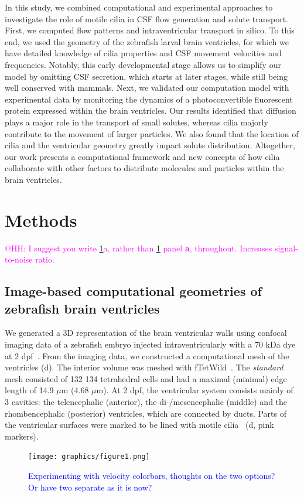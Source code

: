 \documentclass[fleqn]{wlscirep}
\newcommand{\lyng}[1]{\textcolor{blue}{#1}}
\newcommand{\mer}[1]{\textcolor{magenta}{#1}}
\begin{document}
In this study, we combined computational and experimental approaches to investigate the role of motile cilia in CSF flow generation and solute transport.
First, we computed flow patterns and intraventricular transport in silico. To this end, we used the geometry of the zebrafish larval brain ventricles,
for which we have detailed knowledge of cilia properties and CSF movement velocities and frequencies.
Notably, this early developmental stage allows us to simplify our model by omitting CSF secretion, which starts at later stages, while still being well conserved with mammals.
Next, we validated our computation model with experimental data by monitoring the dynamics of a photoconvertible fluorescent protein expressed within the brain ventricles.
Our results identified that diffusion plays a major role in the transport of small solutes, whereas cilia majorly contribute to the movement of larger particles.
We also found that the location of cilia and the ventricular geometry greatly impact solute distribution.
Altogether, our work presents a computational framework and new concepts of how cilia collaborate with other factors to distribute molecules and particles within the brain ventricles. 

\section*{Methods}

\mer{@HH: I suggest you write \cref{fig:figure1}a, rather than \cref{fig:figure1} panel \textbf{a}, throughout. Increases signal-to-noise ratio.}

\subsection*{Image-based computational geometries of zebrafish brain ventricles}
We generated a 3D representation of the brain ventricular walls using confocal imaging data of a zebrafish embryo injected intraventricularly with a 70 kDa dye at 2 dpf~\cite{Olstad2019CiliaryDevelopment}. 
From the imaging data, we constructed a computational mesh of the ventricles (d). The interior volume was meshed with fTetWild~\cite{Hu2020FastWild}. 
The \emph{standard} mesh consisted of 132 134 tetrahedral cells and had a maximal (minimal) edge length of 14.9 $\mu$m (4.68 $\mu$m). 
At 2 dpf, the ventricular system consists mainly of 3 cavities: the telencephalic  (anterior), the di-/mesencephalic  (middle) and the rhombencephalic (posterior) ventricles, which are connected by ducts. 
Parts of the ventricular surfaces were marked to be lined with motile cilia~\cite{Olstad2019CiliaryDevelopment} (d, pink markers).
\begin{figure}%
    \centering
    \texttt{[image: graphics/figure1.png]}
    \caption{\lyng{Experimenting with velocity colorbars, thoughts on the two options? Or have two separate as it is now?}}
    \label{fig:figure1}
\end{figure}
\end{document}
